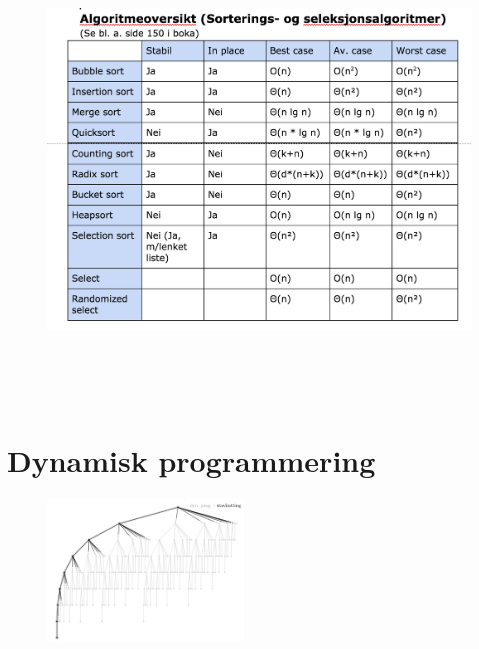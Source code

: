 \documentclass[12pt]{report}
\begin{document}
\begin{figure}[H]
	\begin{Center}
		\includegraphics[width=6.27in,height=4.75in]{./media/image46.png}
	\end{Center}
\end{figure}



\par

\setlength{\parskip}{15.0pt}

\vspace{\baselineskip}\section*{Dynamisk programmering}



\begin{figure}[H]
\advance\leftskip 4.85in		\includegraphics[width=2.05in,height=1.48in]{./media/image47.png}
\end{figure}
\end{document}
